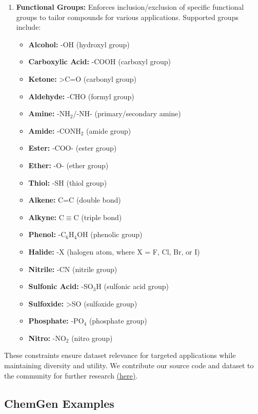\documentclass[10pt]{article} %
\begin{document}
\begin{enumerate}
    
    \item \textbf{Functional Groups:} Enforces inclusion/exclusion of specific functional groups to tailor compounds for various applications. Supported groups include:
\begin{itemize}
    \item \textbf{Alcohol:} -OH (hydroxyl group)
    \item \textbf{Carboxylic Acid:} -COOH (carboxyl group)
    \item \textbf{Ketone:} >C=O (carbonyl group)
    \item \textbf{Aldehyde:} -CHO (formyl group)
    \item \textbf{Amine:} -NH$_2$/-NH- (primary/secondary amine)
    \item \textbf{Amide:} -CONH$_2$ (amide group)
    \item \textbf{Ester:} -COO- (ester group)
    \item \textbf{Ether:} -O- (ether group)
    \item \textbf{Thiol:} -SH (thiol group)
    \item \textbf{Alkene:} C=C (double bond)
    \item \textbf{Alkyne:} C$\equiv$C (triple bond)
    \item \textbf{Phenol:} -C$_6$H$_4$OH (phenolic group)
    \item \textbf{Halide:} -X (halogen atom, where X = F, Cl, Br, or I)
    \item \textbf{Nitrile:} -CN (nitrile group)
    \item \textbf{Sulfonic Acid:} -SO$_3$H (sulfonic acid group)
    \item \textbf{Sulfoxide:} >SO (sulfoxide group)
    \item \textbf{Phosphate:} -PO$_4$ (phosphate group)
    \item \textbf{Nitro:} -NO$_2$ (nitro group)
\end{itemize}
    \end{enumerate}
    
    These constraints ensure dataset relevance for targeted applications while maintaining diversity and utility.
    We contribute our source code and dataset to the community for further research \href{https://anonymous.4open.science/r/CDMS-C08D/}{(here)}. 
    
    \subsection{ChemGen Examples}
    
\end{document}
